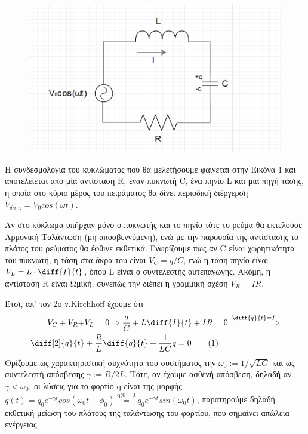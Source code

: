 \documentclass[a4paper]{article}
\newcommand\numberthis{\addtocounter{equation}{1}\tag{\theequation}}
\begin{document}
\begin{figure}
\includegraphics[width=1.0\linewidth]{circuit.png} 
\caption{ }
\label{fig:wrapfig}
\end{figure}

Η συνδεσμολογία του κυκλώματος που θα μελετήσουμε φαίνεται στην Εικόνα 1 και αποτελείεται από μία αντίσταση R, έναν πυκνωτή C, ένα πηνίο L και μια πηγή τάσης, η οποία στο κύριο μέρος του πειράματος θα δίνει περιοδική διέργερση $V_{\delta \iota\epsilon\gamma.}=V_0cos(\omega t)$. 

Αν στο κύκλωμα υπήρχαν μόνο ο πυκνωτής και το πηνίο τότε το ρεύμα θα εκτελούσε Αρμονική Ταλάντωση (μη αποσβεννύμενη), ενώ με την παρουσία της αντίστασης το πλάτος του ρεύματος θα έφθινε εκθετικά. 
Γνωρίζουμε πως αν C είναι χωρητικότητα του πυκνωτή, η τάση στα άκρα του είναι $V_C=q/ C$, ενώ η τάση πηνίο είναι 
$V_L=L\cdot \diff{I}{t}$, όπου L είναι ο συντελεστής αυτεπαγωγής. 
Ακόμη, η αντίσταση R είναι Ωμική, συνεπώς την διέπει η γραμμική σχέση $V_R=IR$.

Έτσι, απ' τον 2ο ν.Kirchhoff έχουμε ότι 
\begin{align*}\label{1}
V_C+V_R+&V_L =0 \Rightarrow \frac{q}{C}+L\diff{I}{t} +IR =0 \xRightarrow{\diff{q}{t}=I} \\ 
\diff[2]{q}{t}& +\frac{R}{L}\diff{q}{t} +\frac{1}{LC} q =0   \numberthis
\end{align*}
Ορίζουμε ως χαρακτηριστική συχνότητα του συστήματος την $\omega_0:=1/\sqrt{LC}$ και ως συντελεστή απόσβεσης $\gamma:=R/2L$. Τότε, αν έχουμε ασθενή απόσβεση, δηλαδή αν $\gamma<\omega_0$, οι λύσεις για το φορτίο q είναι της μορφής $q(t) = q_0 e^{-\gamma t} cos(\omega_0t + \phi_0)\stackrel{\text{q(0)=0}}{=}  q_0 e^{-\gamma t}sin(\omega_0t)$, παρατηρούμε δηλαδή εκθετική μείωση του πλάτους της ταλάντωσης του φορτίου, που σημαίνει απώλεια ενέργειας.
 
\end{document}
